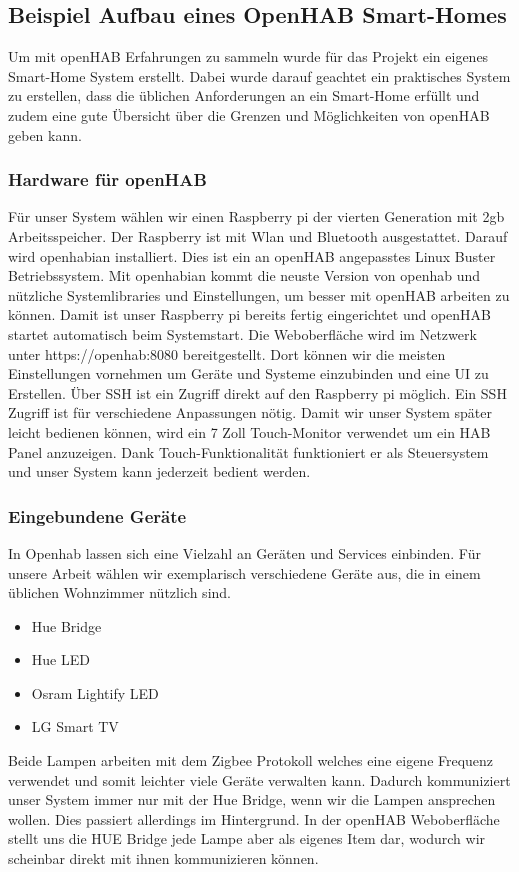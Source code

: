 \subsection{Beispiel Aufbau eines OpenHAB Smart-Homes}
	Um mit openHAB Erfahrungen zu sammeln wurde für das Projekt ein eigenes Smart-Home System erstellt. Dabei wurde darauf geachtet ein praktisches System zu erstellen, dass die üblichen Anforderungen an ein Smart-Home erfüllt und zudem eine gute Übersicht über die Grenzen und Möglichkeiten von openHAB geben kann.

	\subsubsection{Hardware für openHAB}
		Für unser System wählen wir einen Raspberry pi der vierten Generation mit 2gb Arbeitsspeicher. Der Raspberry ist mit Wlan und Bluetooth ausgestattet. Darauf wird openhabian installiert. Dies ist ein an openHAB angepasstes Linux Buster Betriebssystem. Mit openhabian kommt die neuste Version von openhab und nützliche Systemlibraries und Einstellungen, um besser mit openHAB arbeiten zu können. Damit ist unser Raspberry pi bereits fertig eingerichtet und openHAB startet automatisch beim Systemstart. Die Weboberfläche wird im Netzwerk unter https://openhab:8080 bereitgestellt. Dort können wir die meisten Einstellungen vornehmen um Geräte und Systeme einzubinden und eine UI zu Erstellen. Über SSH ist ein Zugriff direkt auf den Raspberry pi möglich. Ein SSH Zugriff ist für verschiedene Anpassungen nötig.
		Damit wir unser System später leicht bedienen können, wird ein 7 Zoll Touch-Monitor verwendet um ein HAB Panel anzuzeigen. Dank Touch-Funktionalität funktioniert er als Steuersystem und unser System kann jederzeit bedient werden.
		
		
	\subsubsection{Eingebundene Geräte}
		In Openhab lassen sich eine Vielzahl an Geräten und Services einbinden. Für unsere Arbeit wählen wir exemplarisch verschiedene Geräte aus, die in einem üblichen Wohnzimmer nützlich sind.
		\begin{itemize}
			\item Hue Bridge
			\item  Hue LED
			\item Osram Lightify LED
			\item LG Smart TV
		\end{itemize}
		Beide Lampen arbeiten mit dem Zigbee Protokoll welches eine eigene Frequenz verwendet und somit leichter viele Geräte verwalten kann. Dadurch kommuniziert unser System immer nur mit der Hue Bridge, wenn wir die Lampen ansprechen wollen. Dies passiert allerdings im Hintergrund. In der openHAB Weboberfläche stellt uns die HUE Bridge jede Lampe aber als eigenes Item dar, wodurch wir scheinbar direkt mit ihnen kommunizieren können.
		
